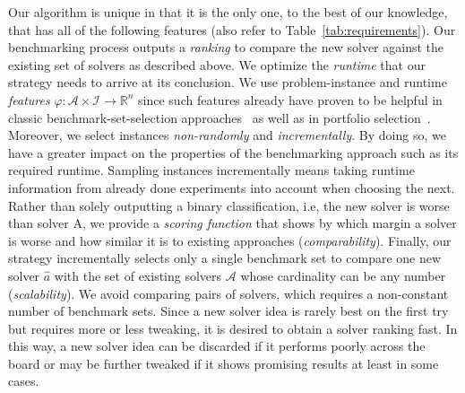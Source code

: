 \documentclass[runningheads]{llncs}
\begin{document}
Our algorithm is unique in that it is the only one, to the best of our knowledge, that has all of the following features (also refer to Table~\ref{tab:requirements}).
Our benchmarking process outputs a \emph{ranking} to compare the new solver against the existing set of solvers as described above.
We optimize the \emph{runtime} that our strategy needs to arrive at its conclusion.
We use problem-instance and runtime \emph{features} $\varphi\!: \mathcal{A} \times \mathcal{I} \rightarrow \mathbb{R}^n$ since such features already have proven to be helpful in classic benchmark-set-selection approaches~\cite{HoosKSS13} as well as in portfolio selection~\cite{CollauttiMMO13,NgokoCT19}.
Moreover, we select instances \emph{non-randomly} and \emph{incrementally}.
By doing so, we have a greater impact on the properties of the benchmarking approach such as its required runtime.
Sampling instances incrementally means taking runtime information from already done experiments into account when choosing the next.
Rather than solely outputting a binary classification, i.e, the new solver is worse than solver A, we provide a \emph{scoring function} that shows by which margin a solver is worse and how similar it is to existing approaches (\emph{comparability}).
Finally, our strategy incrementally selects only a single benchmark set to compare one new solver $\hat{a}$ with the set of existing solvers $\mathcal{A}$ whose cardinality can be any number (\emph{scalability}).
We avoid comparing pairs of solvers, which requires a non-constant number of benchmark sets.
Since a new solver idea is rarely best on the first try but requires more or less tweaking, it is desired to obtain a solver ranking fast.
In this way, a new solver idea can be discarded if it performs poorly across the board or may be further tweaked if it shows promising results at least in some cases.
\end{document}
